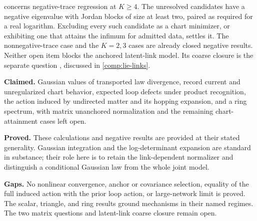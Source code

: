  concerns negative-trace regression at \(K\geq4\). The unresolved
candidates have a negative eigenvalue with Jordan blocks of size at least two, paired as required
for a real logarithm. Excluding every such candidate as a chart minimizer, or exhibiting one that
attains the infimum for admitted data, settles it. The nonnegative-trace case and the \(K=2,3\)
cases are already closed negative results. Neither open item blocks the anchored latent-link
model. Its coarse closure is the separate question , discussed in
\cref{comp:lie-links}.

\begin{verdictbox}{\DELIVERED}
\textbf{Claimed.} Gaussian values of transported law divergence, record current and unregularized
chart behavior, expected loop defects under product recognition, the action induced by undirected
matter and its hopping expansion, and a ring spectrum, with matrix unanchored normalization and
the remaining chart-attainment cases left open.

\textbf{Proved.} These calculations and negative results are provided at their stated generality.
Gaussian integration and the log-determinant expansion are standard in substance; their role here
is to retain the link-dependent normalizer and distinguish a conditional Gaussian law from the
whole joint model.

\textbf{Gaps.} No nonlinear convergence, anchor or covariance selection, equality of the full
induced action with the prior loop action, or large-network limit is proved. The scalar, triangle,
and ring results ground mechanisms in their named regimes. The two matrix questions and
latent-link coarse closure remain open.
\end{verdictbox}
